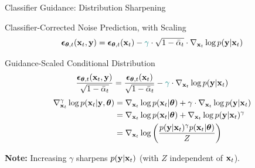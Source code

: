 \documentclass{beamer}
\begin{document}
\begin{frame}{Classifier Guidance: Distribution Sharpening}
	\begin{block}{Classifier-Corrected Noise Prediction, with Scaling}
		\vspace{-0.3cm}
		\[
			\boldsymbol{\epsilon}_{\boldsymbol{\theta}, t}(\mathbf{x}_t, \mathbf{y}) = \boldsymbol{\epsilon}_{\boldsymbol{\theta}, t}(\mathbf{x}_t) - {\color{teal}\gamma} \cdot \sqrt{1 - \bar{\alpha}_t} \cdot \nabla_{\mathbf{x}_t} \log p(\mathbf{y} | \mathbf{x}_t)
		\]
		\vspace{-0.7cm}
	\end{block}
	\begin{block}{Guidance-Scaled Conditional Distribution}
		\[
			\frac{\boldsymbol{\epsilon}_{\boldsymbol{\theta}, t}(\mathbf{x}_t, \mathbf{y})}{\sqrt{1 - \bar{\alpha}_t}} = \frac{\boldsymbol{\epsilon}_{\boldsymbol{\theta}, t}(\mathbf{x}_t)}{\sqrt{1 - \bar{\alpha}_t}} - {\color{teal}\gamma} \cdot \nabla_{\mathbf{x}_t} \log p(\mathbf{y} | \mathbf{x}_t)
		\]
		\vspace{-0.5cm}
		\begin{align*}
			\nabla_{\mathbf{x}_t}^{\gamma} \log p(\mathbf{x}_t | \mathbf{y}, \boldsymbol{\theta}) &= \nabla_{\mathbf{x}_t} \log p(\mathbf{x}_t | \boldsymbol{\theta}) + \gamma \cdot \nabla_{\mathbf{x}_t} \log p(\mathbf{y} | \mathbf{x}_t) \\
			&= \nabla_{\mathbf{x}_t} \log p(\mathbf{x}_t | \boldsymbol{\theta}) + \nabla_{\mathbf{x}_t} \log p(\mathbf{y} | \mathbf{x}_t)^{\gamma} \\
			&= \nabla_{\mathbf{x}_t} \log \left( \frac{p(\mathbf{y} | \mathbf{x}_t)^{\gamma} p(\mathbf{x}_t | \boldsymbol{\theta})}{Z} \right)
		\end{align*}
		\vspace{-0.5cm}
	\end{block}
	\textbf{Note:} Increasing $\gamma$ sharpens $p(\mathbf{y} | \mathbf{x}_t)$ (with $Z$ independent of $\mathbf{x}_t$).
\end{frame}
\end{document}
